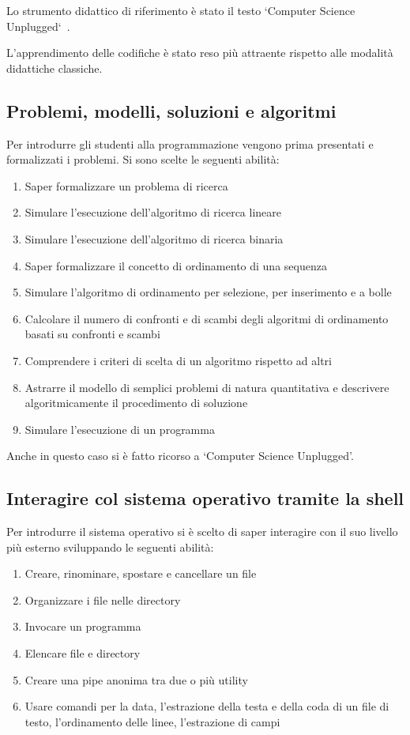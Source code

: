 \documentclass[a4paper]{easychair}
\begin{document}
Lo strumento didattico di riferimento è stato il testo
`Computer Science Unplugged`~\cite{csu}.

L'apprendimento delle codifiche è stato reso più attraente rispetto alle modalità
didattiche classiche.

\subsection[Problemi e algoritmi]{Problemi, modelli, soluzioni e algoritmi}

Per introdurre gli studenti alla programmazione vengono prima presentati
e formalizzati i problemi.
Si sono scelte le seguenti abilità:

\begin{enumerate}
  \item
    Saper formalizzare un problema di ricerca
  \item
    Simulare l'esecuzione dell'algoritmo di ricerca lineare
  \item
    Simulare l'esecuzione dell'algoritmo di ricerca binaria
  \item
    Saper formalizzare il concetto di ordinamento di una sequenza
  \item
    Simulare l'algoritmo di ordinamento per selezione, per inserimento e a bolle
  \item
    Calcolare il numero di confronti e di scambi degli algoritmi di
    ordinamento basati su confronti e scambi
  \item
    Comprendere i criteri di scelta di un algoritmo rispetto ad altri
  \item
    Astrarre il modello di semplici problemi di natura quantitativa e
    descrivere algoritmicamente il procedimento di soluzione
  \item
    Simulare l'esecuzione di un programma
\end{enumerate}
  
Anche in questo caso si è fatto ricorso a `Computer Science Unplugged'.

\subsection[Sistemi Operativi]{Interagire col sistema operativo tramite la shell}

Per introdurre il sistema operativo si è scelto di saper interagire con il suo
livello più esterno sviluppando le seguenti abilità:

\begin{enumerate}
  \def\labelenumi{\arabic{enumi}.}
  \item
    Creare, rinominare, spostare e cancellare un file
  \item
    Organizzare i file nelle directory
  \item
    Invocare un programma
  \item
    Elencare file e directory
  \item
    Creare una pipe anonima tra due o più utility
  \item
    Usare comandi per la data, l'estrazione della testa e della coda
    di un file di testo, l'ordinamento delle linee, l'estrazione di campi
\end{enumerate}
\end{document}
